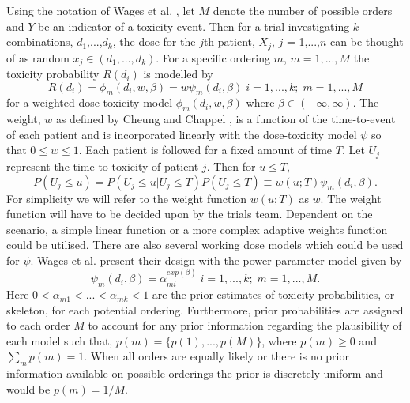 Using the notation of Wages et al. \cite{wagesContinualReassessmentMethod2011,wagesUsingTimetoeventContinual2013}, let $M$ denote the number of possible orders and $Y$ be an indicator of a toxicity event. Then for a trial investigating $k$ combinations, $d_{1}$,...,$d_{k}$, the dose for the $j$th patient, $X_{j}$, $j$ = 1,...,$n$ can be thought of as random $x_{j} \in (d_{1}, ..., d_{k})$. For a specific ordering $m$, $m = 1,...,M$ the toxicity probability $R(d_{i})$ is modelled by 
\begin{equation}
R(d_{i}) =  \phi_m(d_i,w,\beta) = w\psi_m(d_i,\beta) \; i = 1, ..., k; \; m = 1, ...,M
\end{equation}
for  a weighted dose-toxicity model $\phi_m(d_i,w,\beta)$ where $\beta \in (-\infty, \infty)$. The weight, $w$ as defined by Cheung and Chappel \cite{cheungSequentialDesignsPhase2000}, is a function of the time-to-event of each patient and is incorporated linearly with the dose-toxicity model $\psi$ so that $0 \leq w \leq 1$. Each patient is followed for a fixed amount of time $T$. Let $U_j$ represent the time-to-toxicity of patient $j$. Then for $u \leq T$, 
\begin{equation}
	P(U_j \leq u ) = P(U_j \leq u |U_j \leq T)P(U_j \leq T) \equiv w(u;T) \psi_m(d_i,\beta).
\end{equation}
For simplicity we will refer to the weight function $w(u;T)$ as $w$. The weight function will have to be decided upon by the trials team. Dependent on the scenario, a simple linear function or a more complex adaptive weights function could be utilised. There are also several working dose models which could be used for $\psi$. Wages et al. \cite{wagesUsingTimetoeventContinual2013} present their design with the power parameter model given by 
\begin{equation}
	\psi_m(d_i,\beta) = \alpha_{mi}^{exp(\beta)} \; i = 1,...,k; \; m = 1,...,M.
\end{equation}
Here $0 < \alpha_{m1} < ... < \alpha_{mk} < 1$ are the prior estimates of toxicity probabilities, or skeleton, for each potential ordering. Furthermore, prior probabilities are assigned to each order $M$ to account for any prior information regarding the plausibility of each model such that, $p(m) = \{p(1),...,p(M)\}$, where $p(m) \geq 0$ and $\sum_mp(m)=1$. When all orders are equally likely or there is no prior information available on possible orderings the prior is discretely uniform and would be $p(m) = 1/M$. 

